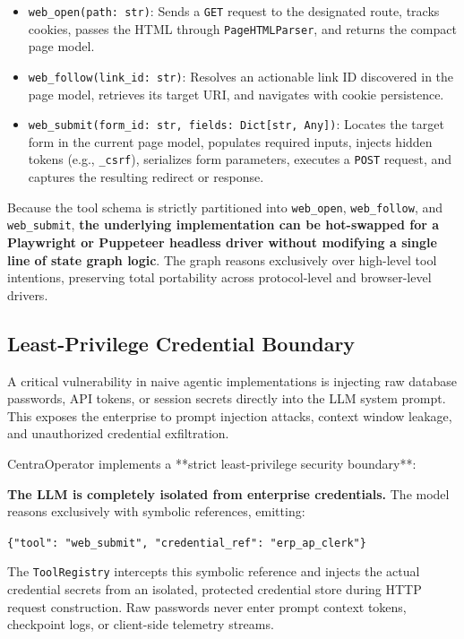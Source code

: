 \begin{itemize}[leftmargin=*]
  \item \texttt{web\_open(path: str)}: Sends a \texttt{GET} request to the designated route, tracks cookies, passes the HTML through \texttt{PageHTMLParser}, and returns the compact page model.
  \item \texttt{web\_follow(link\_id: str)}: Resolves an actionable link ID discovered in the page model, retrieves its target URI, and navigates with cookie persistence.
  \item \texttt{web\_submit(form\_id: str, fields: Dict[str, Any])}: Locates the target form in the current page model, populates required inputs, injects hidden tokens (e.g., \texttt{\_csrf}), serializes form parameters, executes a \texttt{POST} request, and captures the resulting redirect or response.
\end{itemize}

\begin{insightbox}
Because the tool schema is strictly partitioned into \texttt{web\_open}, \texttt{web\_follow}, and \texttt{web\_submit}, \textbf{the underlying implementation can be hot-swapped for a Playwright or Puppeteer headless driver without modifying a single line of state graph logic}. The graph reasons exclusively over high-level tool intentions, preserving total portability across protocol-level and browser-level drivers.
\end{insightbox}

\subsection{Least-Privilege Credential Boundary}
A critical vulnerability in naive agentic implementations is injecting raw database passwords, API tokens, or session secrets directly into the LLM system prompt. This exposes the enterprise to prompt injection attacks, context window leakage, and unauthorized credential exfiltration.

CentraOperator implements a **strict least-privilege security boundary**:

\begin{guardrailbox}
\textbf{The LLM is completely isolated from enterprise credentials.} The model reasons exclusively with symbolic references, emitting:
\begin{center}
\texttt{\{"tool": "web\_submit", "credential\_ref": "erp\_ap\_clerk"\}}
\end{center}
The \texttt{ToolRegistry} intercepts this symbolic reference and injects the actual credential secrets from an isolated, protected credential store during HTTP request construction. Raw passwords never enter prompt context tokens, checkpoint logs, or client-side telemetry streams.
\end{guardrailbox}
